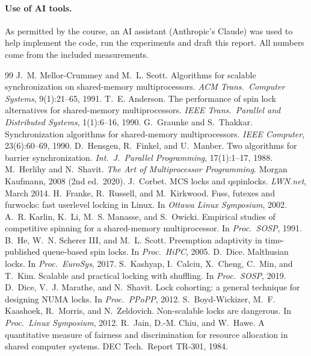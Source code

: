 \documentclass[10pt,twocolumn]{article}
\begin{document}
\paragraph{Use of AI tools.} As permitted by the course, an AI assistant (Anthropic's Claude) was used
to help implement the code, run the experiments and draft this report. All numbers come from the
included measurements.


\begin{thebibliography}{99}\setlength\itemsep{0pt}\small
{} J.~M. Mellor-Crummey and M.~L. Scott. Algorithms for scalable synchronization on
shared-memory multiprocessors. \emph{ACM Trans.\ Computer Systems}, 9(1):21--65, 1991.
 T.~E. Anderson. The performance of spin lock alternatives for shared-memory
multiprocessors. \emph{IEEE Trans.\ Parallel and Distributed Systems}, 1(1):6--16, 1990.
 G.~Graunke and S.~Thakkar. Synchronization algorithms for shared-memory multiprocessors.
\emph{IEEE Computer}, 23(6):60--69, 1990.
 D.~Hensgen, R.~Finkel, and U.~Manber. Two algorithms for barrier synchronization.
\emph{Int.\ J.\ Parallel Programming}, 17(1):1--17, 1988.
 M.~Herlihy and N.~Shavit. \emph{The Art of Multiprocessor Programming}. Morgan Kaufmann,
2008 (2nd ed.\ 2020).
 J.~Corbet. MCS locks and qspinlocks. \emph{LWN.net}, March 2014.
 H.~Franke, R.~Russell, and M.~Kirkwood. Fuss, futexes and furwocks: fast userlevel
locking in Linux. In \emph{Ottawa Linux Symposium}, 2002.
 A.~R. Karlin, K.~Li, M.~S. Manasse, and S.~Owicki. Empirical studies of competitive
spinning for a shared-memory multiprocessor. In \emph{Proc.\ SOSP}, 1991.
 B.~He, W.~N. Scherer III, and M.~L. Scott. Preemption adaptivity in time-published
queue-based spin locks. In \emph{Proc.\ HiPC}, 2005.
 D.~Dice. Malthusian locks. In \emph{Proc.\ EuroSys}, 2017.
 S.~Kashyap, I.~Calciu, X.~Cheng, C.~Min, and T.~Kim. Scalable and practical locking with
shuffling. In \emph{Proc.\ SOSP}, 2019.
 D.~Dice, V.~J. Marathe, and N.~Shavit. Lock cohorting: a general technique for designing
NUMA locks. In \emph{Proc.\ PPoPP}, 2012.
 S.~Boyd-Wickizer, M.~F. Kaashoek, R.~Morris, and N.~Zeldovich. Non-scalable locks
are dangerous. In \emph{Proc.\ Linux Symposium}, 2012.
 R.~Jain, D.-M. Chiu, and W.~Hawe. A quantitative measure of fairness and discrimination for
resource allocation in shared computer systems. DEC Tech.\ Report TR-301, 1984.
\end{thebibliography}
\end{document}

